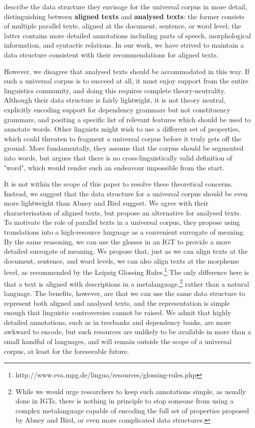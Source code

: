 \documentclass[11pt]{article}
\begin{document}
 describe the data structure they envisage for the universal corpus in more detail, distinguishing between \textbf{aligned texts} and \textbf{analysed texts}: the former consists of multiple parallel texts, aligned at the document, sentence, or word level; the latter contains more detailed annotations including parts of speech, morphological information, and syntactic relations. In our work, we have strived to maintain a data structure consistent with their recommendations for aligned texts.

However, we disagree that analysed texts should be accommodated in this way. If such a universal corpus is to succeed at all, it must enjoy support from the entire linguistics community, and doing this requires complete theory-neutrality. Although their data structure is fairly lightwight, it is not theory neutral, explicitly encoding support for dependency grammars but not constituency grammars, and positing a specific list of relevant features which should be used to annotate words. Other linguists might wish to use a different set of properties, which could threaten to fragment a universal corpus before it truly gets off the ground. More fundamentally, they assume that the corpus should be segmented into words, but  argues that there is no cross-linguistically valid definition of "word", which would render such an endeavour impossible from the start.

It is not within the scope of this paper to resolve these theoretical concerns. Instead, we suggest that the data structure for a universal corpus should be even more lightweight than Abney and Bird suggest. We agree with their characterisation of aligned texts, but propose an alternative for analysed texts. To motivate the role of parallel texts in a universal corpus, they propose using translations into a high-resource language as a convenient surrogate of meaning. By the same reasoning, we can use the glosses in an IGT to provide a more detailed surrogate of meaning. We propose that, just as we can align texts at the document, sentence, and word levels, we can also align texts at the morpheme level, as recommended by the Leipzig Glossing Rules.\footnote{http://www.eva.mpg.de/lingua/resources/glossing-rules.php} The only difference here is that a text is aligned with descriptions in a metalanguage,\footnote{While we would urge researchers to keep such annotations simple, as usually done in IGTs, there is nothing in principle to stop someone from using a complex metalanguage capable of encoding the full set of properties proposed by Abney and Bird, or even more complicated data structures.} rather than a natural language. The benefits, however, are that we can use the same data structure to represent both aligned and analysed texts, and the representation is simple enough that linguistic controversies cannot be raised. We admit that highly detailed annotations, such as in treebanks and dependency banks, are more awkward to encode, but such resources are unlikely to be available in more than a small handful of languages, and will remain outside the scope of a universal corpus, at least for the foreseeable future.
\end{document}
